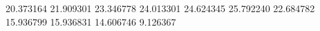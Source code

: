 20.373164
21.909301
23.346778
24.013301
24.624345
25.792240
22.684782
15.936799
15.936831
14.606746
9.126367

